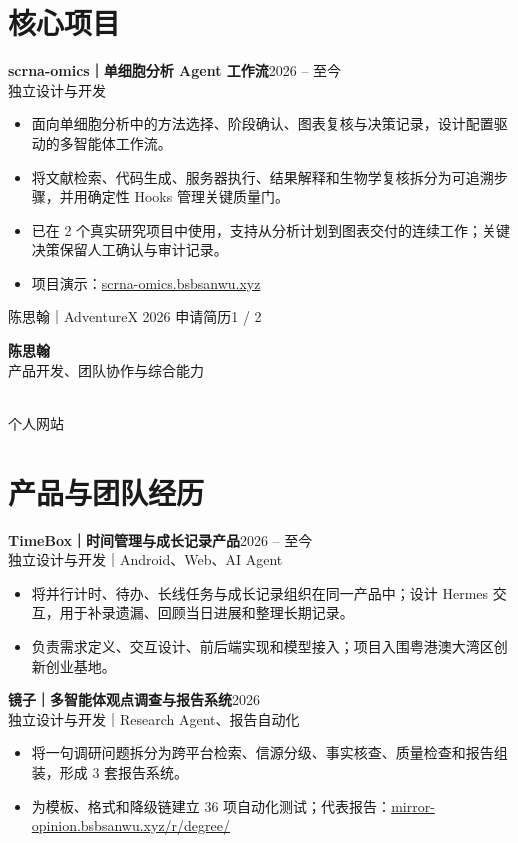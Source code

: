 \documentclass[10.5pt,a4paper]{ctexart}
\newcommand{\projectentry}[3]{%
  \textbf{#1}\hfill{\small\color{muted}#2}\\[-1pt]
  {\small\color{navy}#3}\par
}
\begin{document}
\section{核心项目}

\projectentry{scrna-omics｜单细胞分析 Agent 工作流}{2026 -- 至今}{独立设计与开发}
\begin{itemize}
  \item 面向单细胞分析中的方法选择、阶段确认、图表复核与决策记录，设计配置驱动的多智能体工作流。
  \item 将文献检索、代码生成、服务器执行、结果解释和生物学复核拆分为可追溯步骤，并用确定性 Hooks 管理关键质量门。
  \item 已在 2 个真实研究项目中使用，支持从分析计划到图表交付的连续工作；关键决策保留人工确认与审计记录。
  \item 项目演示：\href{https://scrna-omics.bsbsanwu.xyz/}{scrna-omics.bsbsanwu.xyz}
\end{itemize}

\vfill
{\footnotesize\color{muted}陈思翰｜AdventureX 2026 申请简历}\hfill{\footnotesize\color{muted}1 / 2}

\newpage

\begin{minipage}[t]{0.82\textwidth}
  {\fontsize{18}{22}\selectfont\bfseries\sffamily 陈思翰}\\[2pt]
  {\small\color{muted}产品开发、团队协作与综合能力}
\end{minipage}
\hfill
\begin{minipage}[t]{0.12\textwidth}
  \raggedleft
  \\[-1pt]
  {\scriptsize\color{muted}个人网站}
\end{minipage}

\section{产品与团队经历}

\projectentry{TimeBox｜时间管理与成长记录产品}{2026 -- 至今}{独立设计与开发｜Android、Web、AI Agent}
\begin{itemize}
  \item 将并行计时、待办、长线任务与成长记录组织在同一产品中；设计 Hermes 交互，用于补录遗漏、回顾当日进展和整理长期记录。
  \item 负责需求定义、交互设计、前后端实现和模型接入；项目入围粤港澳大湾区创新创业基地。
\end{itemize}

\projectentry{镜子｜多智能体观点调查与报告系统}{2026}{独立设计与开发｜Research Agent、报告自动化}
\begin{itemize}
  \item 将一句调研问题拆分为跨平台检索、信源分级、事实核查、质量检查和报告组装，形成 3 套报告系统。
  \item 为模板、格式和降级链建立 36 项自动化测试；代表报告：\href{https://mirror-opinion.bsbsanwu.xyz/r/degree/}{mirror-opinion.bsbsanwu.xyz/r/degree/}
\end{itemize}
\end{document}
